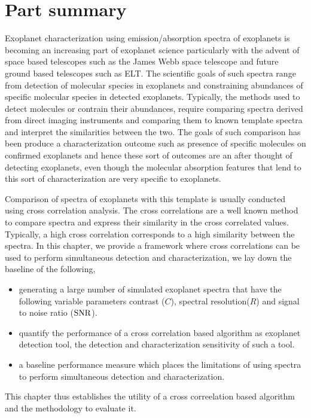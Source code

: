 \chapter*{Part summary}
Exoplanet characterization using emission/absorption spectra of exoplanets is becoming an increasing part of exoplanet science particularly\@ 
with the advent of space based telescopes such as the James Webb space telescope and future ground based telescopes such as ELT.\@
The scientific goals of such spectra range from detection of molecular species in  exoplanets and constraining abundances of specific\@
molecular species in detected exoplanets.
Typically, the methods used to detect molecules or contrain their abundances, require comparing spectra derived from direct imaging instruments and \@ 
comparing them to known template spectra and interpret the similarities between the two.
The goals of such comparison has been produce a characterization outcome such as presence of specific molecules on confirmed exoplanets and hence\@
these sort of outcomes are an after thought of detecting exoplanets, even though the molecular absorption features that lend to this sort of characterization \@
are very specific to exoplanets.

Comparison of spectra of exoplanets with this template is usually conducted using cross correlation analysis. The cross correlations are a well known method \@
to compare spectra and express their similarity in the cross correlated values. 
Typically, a high cross correlation corresponds to a high similarity between the spectra.
In this chapter, we provide a framework where cross correlations can be used to perform simultaneous detection and characterization, we lay down the baseline\@
of the following,
\begin{itemize}
    \item generating a large number of simulated exoplanet spectra that have the following variable parameters contrast ($C$), spectral resolution($R$) \@
    and signal to noise ratio ($\rm{SNR}$).
    \item quantify the performance of a cross correlation based algorithm as exoplanet detection tool, the detection and characterization sensitivity\@
    of such a tool.
    \item a baseline performance measure which places the limitations of using spectra to perform simultaneous detection and characterization.
\end{itemize}
This chapter thus establishes the utility of a cross correelation based algorithm and the methodology to evaluate\@
it.

